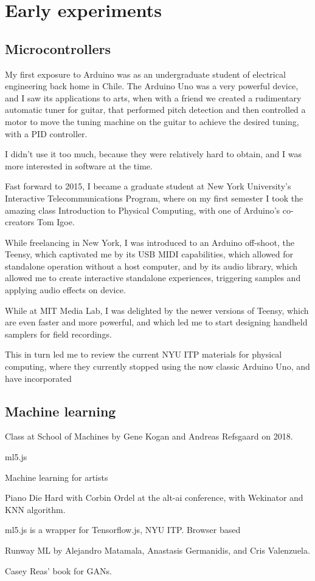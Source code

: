 \chapter{Early experiments}

\section{Microcontrollers}

My first exposure to Arduino was as an undergraduate student of electrical engineering back home in Chile. The Arduino Uno was a very powerful device, and I saw its applications to arts, when with a friend we created a rudimentary automatic tuner for guitar, that performed pitch detection and then controlled a motor to move the tuning machine on the guitar to achieve the desired tuning, with a PID controller.

I didn't use it too much, because they were relatively hard to obtain, and I was more interested in software at the time.

Fast forward to 2015, I became a graduate student at New York University's Interactive Telecommunications Program, where on my first semester I took the amazing class Introduction to Physical Computing, with one of Arduino's co-creators Tom Igoe.

While freelancing in New York, I was introduced to an Arduino off-shoot, the Teensy, which captivated me by its USB MIDI capabilities, which allowed for standalone operation without a host computer, and by its audio library, which allowed me to create interactive standalone experiences, triggering samples and applying audio effects on device.

While at MIT Media Lab, I was delighted by the newer versions of Teensy, which are even faster and more powerful, and which led me to start designing handheld samplers for field recordings.

This in turn led me to review the current NYU ITP materials for physical computing, where they currently stopped using the now classic Arduino Uno, and have incorporated 


\section{Machine learning}

Class at School of Machines by Gene Kogan and Andreas Refsgaard on 2018.

ml5.js

Machine learning for artists

Piano Die Hard with Corbin Ordel at the alt-ai conference, with Wekinator and KNN algorithm.

ml5.js is a wrapper for Tensorflow.js, NYU ITP. Browser based

Runway ML by Alejandro Matamala, Anastasis Germanidis, and Cris Valenzuela.

Casey Reas' book for GANs.
